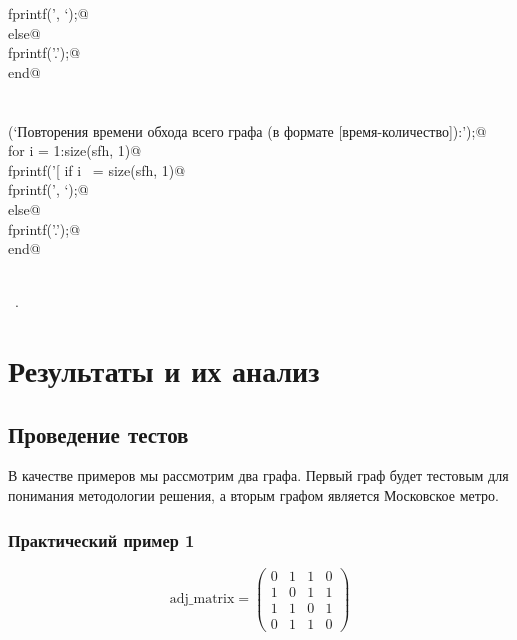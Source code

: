 \documentclass{article}
\begin{document}
\begin{flushleft}
\begin{minipage}{\linewidth}
\begin{list}{}{}
\mbox{}\verb@           fprintf(’, ‘);@\\
\mbox{}\verb@       else@\\
\mbox{}\verb@           fprintf(’.\n’);@\\
\mbox{}\verb@       end@\\
\mbox{}\verb@end@\\
\mbox{}\verb@@\\
\mbox{}\verb@fprintf(‘Повторения времени обхода всего графа (в формате [время-количество]):\n’);@\\
\mbox{}\verb@    for i = 1:size(sfh, 1)@\\
\mbox{}\verb@       fprintf(’[%d-%d]’, sct(i, 1), sct(i, 2));@\\
\mbox{}\verb@       if i ~= size(sfh, 1)@\\
\mbox{}\verb@           fprintf(’, ‘);@\\
\mbox{}\verb@       else@\\
\mbox{}\verb@           fprintf(’.\n’);@\\
\mbox{}\verb@       end@\\
\mbox{}\verb@end@\\
\mbox{}\verb@@{\NWsep}
\end{list}
\vspace{-1.5ex}
\footnotesize
\begin{list}{}{\setlength{\itemsep}{-\parsep}\setlength{\itemindent}{-\leftmargin}}
\item \NWtxtMacroRefIn\ .

\item{}
\end{list}
\end{minipage}\vspace{4ex}
\end{flushleft}
\section{Результаты и их анализ}

\subsection{Проведение тестов}

В качестве примеров мы рассмотрим два графа. Первый граф будет тестовым для понимания методологии решения, а вторым графом является Московское метро.

\subsubsection{Практический пример 1}
\[
\text{adj_matrix} = \begin{pmatrix}
0 & 1 & 1 & 0 \\ 
1 & 0 & 1 & 1 \\ 
1 & 1 & 0 & 1 \\
0 & 1 & 1 & 0 
\end{pmatrix}
\]
\end{document}

